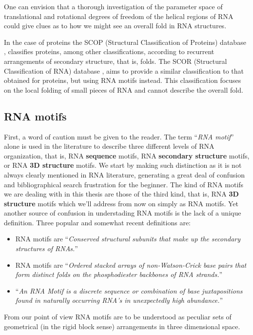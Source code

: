 One can envision that a  thorough investigation of the parameter space
of  translational and  rotational degrees  of freedom  of  the helical
regions of RNA could give clues as to how we might see an overall fold
in RNA structures.

In  the  case  of  proteins  the SCOP  (Structural  Classification  of
Proteins)  database  \cite{andreeva2004},  classifies proteins,  among
other   classifications,  according   to  recurrent   arrangements  of
secondary   structure,   that  is,   folds.    The  SCOR   (Structural
Classification of RNA) database \cite{klosterman2002, klosterman2004},
aims  to  provide  a  similar  classification  to  that  obtained  for
proteins, but using RNA motifs instead. This classification focuses on
the  local folding  of small  pieces of  RNA and  cannot  describe the
overall fold.

\subsection{RNA motifs}
First,  a word  of  caution must  be  given to  the  reader. The  term
``\textit{RNA  motif}'' alone is  used in  the literature  to describe
three   different   levels  of   RNA   organization,   that  is,   RNA
\textbf{sequence} motifs, RNA  \textbf{secondary structure} motifs, or
RNA \textbf{3D structure} motifs.  We start by making such distinction
as it is not always  clearly mentioned in RNA literature, generating a
great deal of confusion and bibliographical search frustration for the
beginner. The  kind of RNA  motifs we  are dealing with  in this
thesis are those of the third kind, that is, RNA \textbf{3D structure}
motifs  which we'll  address from  now on  simply as  RNA  motifs. Yet
another source of confusion in  understading RNA motifs is the lack of
a  unique definition. Three popular and  somewhat
recent definitions are:
\begin{itemize}
\item{RNA motifs are ``\textit{Conserved structural subunits that make
    up the secondary structures of RNAs.}''\cite{holbrook2005}}
\item{RNA   motifs    are   ``\textit{Ordered   stacked    arrays   of
    non-Watson-Crick  base  pairs  that  form distinct  folds  on  the
    phosphodiester backbones of RNA strands.}''\cite{leontis2003}}
\item{``\textit{An RNA Motif is  a discrete sequence or combination of
    base  juxtapositions   found  in  naturally   occurring  RNA's  in
    unexpectedly high abundance.}''\cite{moore1999}}
\end{itemize}
From our point of view RNA motifs are to be understood as  peculiar
sets of geometrical  (in the rigid block sense)  arrangements in three
dimensional space.

